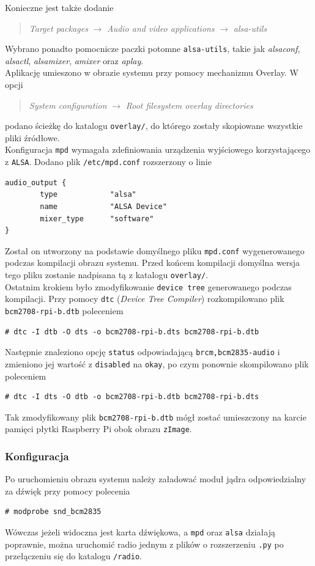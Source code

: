 \documentclass[10pt,a4paper]{article}
\begin{document}
Konieczne jest także dodanie
\begin{quote}
\textit{Target packages} $\rightarrow$ \textit{Audio and video applications} $\rightarrow$ \textit{alsa-utils}
\end{quote}
Wybrano ponadto pomocnicze paczki potomne \texttt{alsa-utils}, takie jak \textit{alsaconf}, \textit{alsactl}, \textit{alsamixer}, \textit{amixer} oraz \textit{aplay}.\\[\baselineskip]
Aplikację umieszono w obrazie systemu przy pomocy mechanizmu Overlay. W opcji
\begin{quote}
\textit{System configuration} $\rightarrow$ \textit{Root filesystem overlay directories}
\end{quote}
podano ścieżkę do katalogu \texttt{overlay/}, do którego zostały skopiowane wszystkie pliki źródłowe.\\[\baselineskip]
Konfiguracja \texttt{mpd} wymagała zdefiniowania urządzenia wyjściowego korzystającego z \texttt{ALSA}. Dodano plik \texttt{/etc/mpd.conf} rozszerzony o linie
\begin{lstlisting}[style=bash, keywordstyle=\color{black}]
audio_output {                                                                  
        type            "alsa"
        name            "ALSA Device"
        mixer_type      "software"
}
\end{lstlisting}
Został on utworzony na podstawie domyślnego pliku \texttt{mpd.conf} wygenerowanego podczas kompilacji obrazu systemu. Przed końcem kompilacji domyślna wersja tego pliku zostanie nadpisana tą z katalogu \texttt{overlay/}.\\[\baselineskip]
Ostatnim krokiem było zmodyfikowanie \texttt{device tree} generowanego podczas kompilacji. Przy pomocy \texttt{dtc} (\textit{Device Tree Compiler}) rozkompilowano plik \texttt{bcm2708-rpi-b.dtb} poleceniem
\begin{lstlisting}[style=bash, commentstyle=\color{black}]
# dtc -I dtb -O dts -o bcm2708-rpi-b.dts bcm2708-rpi-b.dtb
\end{lstlisting}
Następnie znaleziono opcję \texttt{status} odpowiadającą \texttt{brcm,bcm2835-audio} i zmieniono jej wartość z \texttt{disabled} na \texttt{okay}, po czym ponownie skompilowano plik poleceniem
\begin{lstlisting}[style=bash, commentstyle=\color{black}]
# dtc -I dts -O dtb -o bcm2708-rpi-b.dtb bcm2708-rpi-b.dts
\end{lstlisting}
Tak zmodyfikowany plik \texttt{bcm2708-rpi-b.dtb} mógł zostać umieszczony na karcie pamięci płytki Raspberry Pi obok obrazu \texttt{zImage}.

\subsubsection{Konfiguracja}
Po uruchomieniu obrazu systemu należy załadować moduł jądra odpowiedzialny za dźwięk przy pomocy polecenia
\begin{lstlisting}[style=bash, commentstyle=\color{black}]
# modprobe snd_bcm2835
\end{lstlisting}
Wówczas jeżeli widoczna jest karta dźwiękowa, a \texttt{mpd} oraz \texttt{alsa} działają poprawnie, można uruchomić radio jednym z plików o rozszerzeniu \texttt{.py} po przełączeniu się do katalogu \texttt{/radio}.
\end{document}
